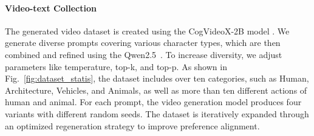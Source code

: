 \paragraph{Video-text Collection} 
The generated video dataset is created using the CogVideoX-2B model \cite{yang2024cogvideox}. We generate diverse prompts covering various character types, which are then combined and refined using the Qwen2.5~\cite{qwen2.5}. To increase diversity, we adjust parameters like temperature, top-k, and top-p. As shown in Fig.~\ref{fig:dataset_statis}, the dataset includes over ten categories, such as Human, Architecture, Vehicles, and Animals, as well as more than ten different actions of human and animal. For each prompt, the video generation model produces four variants with different random seeds. The dataset is iteratively expanded through an optimized regeneration strategy to improve preference alignment.



